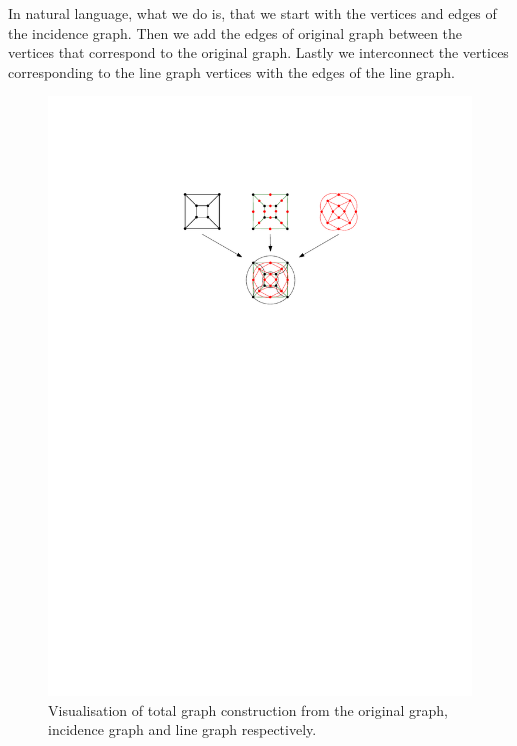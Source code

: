 In natural language, what we do is, that we start with the vertices and edges of the incidence graph. Then we add the edges of original graph between the vertices that correspond to the original graph. Lastly we interconnect the vertices corresponding to the line graph vertices with the edges of the line graph.

\begin{figure}[H]
    \centering
    \includegraphics[width=1\textwidth]{../Resources/Figs/cubical_total_graph.pdf}
    \caption{Visualisation of total graph construction from the original graph, incidence graph and line graph respectively.}
    \label{fig:cubical_total_graph}
\end{figure}

